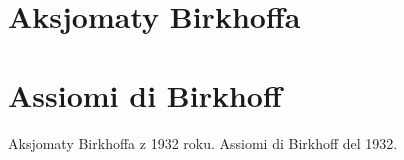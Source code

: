 %

\section{Aksjomaty Birkhoffa} %
\section{Assiomi di Birkhoff} %
Aksjomaty Birkhoffa z 1932 roku. %
Assiomi di Birkhoff del 1932. %


%
